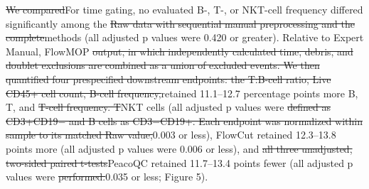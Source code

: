 \documentclass[
  11pt,
  a4paper,
]{article}
\begin{document}
{\color{revisionred}\sout{We compared}}{\color{revisionblue}For time
gating, no evaluated B-, T-, or NKT-cell frequency differed
significantly among} the {\color{revisionred}\sout{Raw data with
sequential manual preprocessing and the
complete}}{\color{revisionblue}methods (all adjusted p values were 0.420
or greater). Relative to Expert Manual,} FlowMOP
{\color{revisionred}\sout{output, in which independently calculated
time, debris, and doublet exclusions are combined as a union of excluded
events. We then quantified four prespecified downstream endpoints: the
T:B-cell ratio, Live CD45+ cell count, B-cell
frequency,}}{\color{revisionblue}retained 11.1--12.7 percentage points
more B, T,} and {\color{revisionred}\sout{T-cell frequency.
T}}{\color{revisionblue}NKT} cells {\color{revisionblue}(all adjusted p
values} were {\color{revisionred}\sout{defined as CD3+CD19− and B cells
as CD3−CD19+. Each endpoint was normalized within sample to its matched
Raw value,}}{\color{revisionblue}0.003 or less), FlowCut retained
12.3--13.8 points more (all adjusted p values were 0.006 or less),} and
{\color{revisionred}\sout{all three unadjusted, two-sided paired
t-tests}}{\color{revisionblue}PeacoQC retained 11.7--13.4 points fewer
(all adjusted p values} were
{\color{revisionred}\sout{performed.}}{\color{revisionblue}0.035 or
less; Figure 5).}
\end{document}
